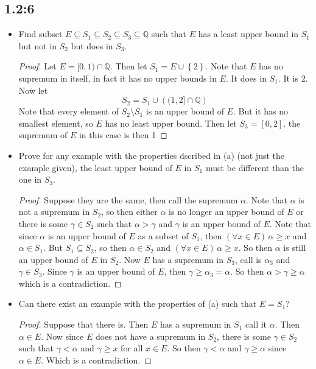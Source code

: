\documentclass[11pt]{article}
\newcommand{\Q}{\mathbb{Q}}
\newenvironment{bp}{\color{blue}\begin{proof}}{\end{proof}}
\renewcommand{\subset}{\subseteq}
\begin{document}
\subsection*{1.2:6}
\begin{itemize}
  \item Find subset $E\subset S_1\subset S_2\subset S_3\subset \Q$ such that $E$ has a least upper bound in $S_1$ but not in $S_2$ but does in $S_3$. 
\begin{bp}
  Let $E = [0,1)\cap \Q$. Then let $S_1 = E\cup \left\{ 2 \right\}$. Note that $E$ has no supremum in itself, in fact it has no upper bounds in $E$. It does in $S_1$. It is 2. Now let \[S_2=S_1\cup\left((1,2]\cap\Q\right)\] Note that every element of $S_2\setminus S_1$ is an upper bound of $E$. But it has no smallest element, so $E$ has no least upper bound. Then let $S_3 = [0,2]$. the supremum of $E$ in this case is then 1
\end{bp}
\item Prove for any example with the properties dscribed in (a) (not just the example given), the least upper bound of $E$ in $S_1$ must be different than the one in $S_3$.
\begin{bp}
  Suppose they are the same, then call the supremum $\alpha$. Note that $\alpha$ is not a supremum in $S_2$, so then either $\alpha$ is no longer an upper bound of $E$ or there is some $\gamma\in S_2$ such that $\alpha > \gamma$ and $\gamma$ is an upper bound of $E$. Note that since $\alpha$ is an upper bound of $E$ as a subset of $S_1$, then $(\forall x\in E)\, \alpha\geq x$ and $\alpha\in S_1$. But $S_1\subset S_2$, so then $\alpha\in S_2$ and $(\forall x\in E)\, \alpha\geq x$. So then $\alpha$ is still an upper bound of $E$ in $S_2$. Now $E$ has a supremum in $S_3$, call is $\alpha_3$ and $\gamma\in S_3$. Since $\gamma$ is an upper bound of $E$, then $\gamma\geq\alpha_3 = \alpha$. So then $\alpha>\gamma\geq\alpha$ which is a contradiction.
\end{bp}
\item Can there exist an example with the properties of (a) such that $E = S_1$?
\begin{bp}
  Suppose that there is. Then $E$ has a supremum in $S_1$ call it $\alpha$. Then $\alpha\in E$. Now since $E$ does not have a supremum in $S_2$, there is some $\gamma\in S_2$ such that $\gamma < \alpha$ and $\gamma\geq x$ for all $x\in E$. So then $\gamma< \alpha$ and $\gamma\geq \alpha$ since $\alpha\in E$. Which is a contradiction.
\end{bp}
\end{itemize}
\end{document}
